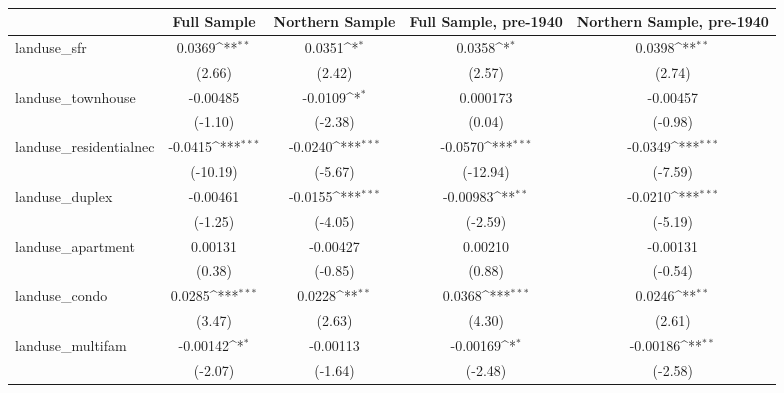 \begin{table}[htbp]\centering
\def\sym#1{\ifmmode^{#1}\else\(^{#1}\)\fi}
\caption{ \label{tab1}}
\begin{tabular}{l*{4}{c}}
\toprule
                    &\multicolumn{1}{c}{Full Sample}&\multicolumn{1}{c}{Northern Sample}&\multicolumn{1}{c}{Full Sample, pre-1940}&\multicolumn{1}{c}{Northern Sample, pre-1940}\\
\midrule
landuse\_sfr         &      0.0369\sym{**} &      0.0351\sym{*}  &      0.0358\sym{*}  &      0.0398\sym{**} \\
                    &      (2.66)         &      (2.42)         &      (2.57)         &      (2.74)         \\
\addlinespace
landuse\_townhouse   &    -0.00485         &     -0.0109\sym{*}  &    0.000173         &    -0.00457         \\
                    &     (-1.10)         &     (-2.38)         &      (0.04)         &     (-0.98)         \\
\addlinespace
landuse\_residentialnec&     -0.0415\sym{***}&     -0.0240\sym{***}&     -0.0570\sym{***}&     -0.0349\sym{***}\\
                    &    (-10.19)         &     (-5.67)         &    (-12.94)         &     (-7.59)         \\
\addlinespace
landuse\_duplex      &    -0.00461         &     -0.0155\sym{***}&    -0.00983\sym{**} &     -0.0210\sym{***}\\
                    &     (-1.25)         &     (-4.05)         &     (-2.59)         &     (-5.19)         \\
\addlinespace
landuse\_apartment   &     0.00131         &    -0.00427         &     0.00210         &    -0.00131         \\
                    &      (0.38)         &     (-0.85)         &      (0.88)         &     (-0.54)         \\
\addlinespace
landuse\_condo       &      0.0285\sym{***}&      0.0228\sym{**} &      0.0368\sym{***}&      0.0246\sym{**} \\
                    &      (3.47)         &      (2.63)         &      (4.30)         &      (2.61)         \\
\addlinespace
landuse\_multifam    &    -0.00142\sym{*}  &    -0.00113         &    -0.00169\sym{*}  &    -0.00186\sym{**} \\
                    &     (-2.07)         &     (-1.64)         &     (-2.48)         &     (-2.58)         \\

\end{tabular}
\end{table}
